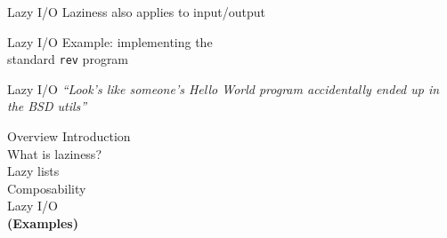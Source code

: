 \documentclass[20pt]{beamer}
\begin{document}
\begin{frame}{Lazy I/O}
    Laziness also applies to input/output
\end{frame}

\begin{frame}{Lazy I/O}
    Example: implementing the \\
    standard \texttt{rev} program
\end{frame}

\begin{frame}{Lazy I/O}
    \textit{``Look's like someone's Hello World program accidentally ended up in
    the BSD utils''}
\end{frame}


\begin{frame}{Overview}
    Introduction \\
    What is laziness? \\
    Lazy lists \\
    Composability \\
    Lazy I/O \\
    \textbf{(Examples)}
\end{frame}
\end{document}
